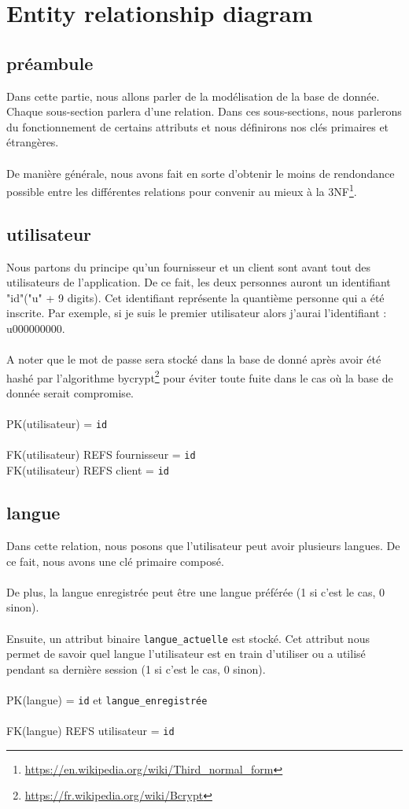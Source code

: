 \section{Entity relationship diagram}
\subsection{préambule}
Dans cette partie, nous allons parler de la modélisation de la base de donnée. Chaque sous-section parlera d'une relation. Dans ces sous-sections, nous parlerons du fonctionnement de certains attributs et nous définirons nos clés primaires et étrangères.
\\ \\ 
De manière générale, nous avons fait en sorte d'obtenir le moins de rendondance possible entre les différentes relations pour convenir au mieux à la 3NF\footnote{ \url{https://en.wikipedia.org/wiki/Third_normal_form}}.
\subsection{utilisateur}
Nous partons du principe qu'un fournisseur et un client sont avant tout des utilisateurs de l'application. De ce fait, les deux personnes auront un identifiant "id"("u" + 9 digits). Cet identifiant représente la quantième personne qui a été inscrite. Par exemple, si je suis le premier utilisateur alors j'aurai l'identifiant : u000000000.
\\ \\
A noter que le mot de passe sera stocké dans la base de donné après avoir été hashé par l'algorithme bycrypt\footnote{\url{https://fr.wikipedia.org/wiki/Bcrypt}} pour éviter toute fuite dans le cas où la base de donnée serait compromise.
\\ \\
PK(utilisateur) = \texttt{id}
\\ \\
FK(utilisateur) REFS fournisseur = \texttt{id}
\\
FK(utilisateur) REFS client = \texttt{id}
\newpage
\subsection{langue}
Dans cette relation, nous posons que l'utilisateur peut avoir plusieurs langues. De ce fait, nous avons une clé primaire composé. 
\\ \\
De plus, la langue enregistrée peut être une langue préférée (1 si c'est le cas, 0 sinon). 
\\ \\
Ensuite, un attribut binaire \texttt{langue\_actuelle} est stocké. Cet attribut nous permet de savoir quel langue l'utilisateur est en train d'utiliser ou a utilisé pendant sa dernière session (1 si c'est le cas, 0 sinon). 
\\ \\
PK(langue) = \texttt{id} et \texttt{langue\_enregistrée}
\\ \\
FK(langue) REFS utilisateur = \texttt{id}
